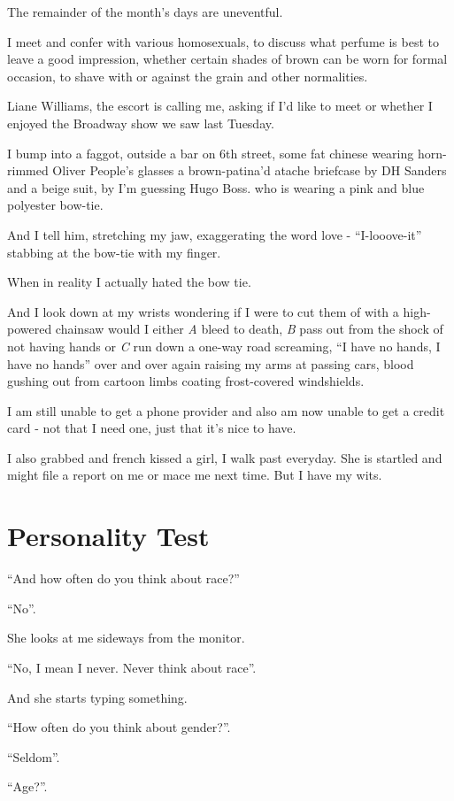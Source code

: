 \documentclass[19pt,openany]{book}
\begin{document}
The remainder of the month's
days are uneventful.

I meet and confer with various
homosexuals, to discuss
what perfume is best to
leave a good impression,
whether certain shades of
brown can be worn for formal
occasion, to shave
with or against the grain and
other normalities.

Liane Williams, the escort
is calling me, asking if I'd
like to meet or whether
I enjoyed the Broadway show
we saw last Tuesday.

I bump into a faggot,
outside
a bar on 6th street,
some fat chinese wearing
horn-rimmed Oliver People's
glasses a brown-patina'd
atache briefcase by DH
Sanders and a beige suit,
by I'm guessing Hugo Boss. who
is wearing a pink and
blue polyester
bow-tie.

And I tell him, stretching my
jaw, exaggerating the
word love - ``I-looove-it'' stabbing
at the bow-tie with my finger.

When in reality I actually
hated the bow tie.

And I look down at my wrists
wondering if I were to
cut them of with a high-powered
chainsaw would I either \textit{A}
bleed to death, \textit{B} pass
out from the shock of not having
hands or \textit{C} run down
a one-way road screaming,
``I have no hands, I have no
hands'' over and over again
raising my arms at passing
cars, blood gushing out from
cartoon limbs coating frost-covered
 windshields.

I am still unable to get a phone
provider and also am now
unable to get a credit card -
not that I need one, just
that it's nice to have.

I also grabbed and french kissed a girl,
I walk past everyday. She is
startled and might file a report
on me or mace me next time. But I
have my wits.

\chapter{Personality Test}
``And how often do you think about race?''

``No''.

She looks at me sideways from
the monitor.

``No, I mean I never. Never think
about race''.

And she starts typing something.

``How often do you think about
gender?''.

``Seldom''.

``Age?''.
\end{document}
